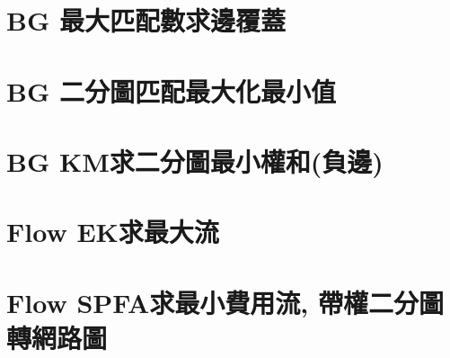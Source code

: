 \documentclass{article}
\begin{document}
\begin{multicols}{2}
\section{BG 最大匹配數求邊覆蓋}



\section{BG 二分圖匹配最大化最小值}



\section{BG KM求二分圖最小權和(負邊)}



\section{Flow EK求最大流}



\section{Flow SPFA求最小費用流, 帶權二分圖轉網路圖}



\end{multicols}
\end{document}
